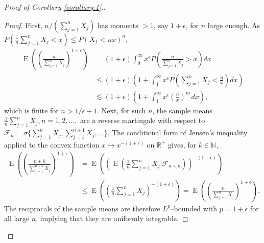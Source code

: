 \documentclass[12pt]{article}
\renewcommand{\P}{P}
\newcommand{\x}{X}
\DeclareMathOperator{\E}{E}
\begin{document}
\begin{proof}[Proof of Corollary \ref{corollary:1}.]
  \begin{proof}
    First, $n/(\sum_{j=1}^n\x_j)$ has moments $>1$, say $1+\epsilon$, for $n$ large enough. As $\P(\frac{1}{n}\sum_{j=1}^n\x_j<x)\le \P(\x_1<nx)^n$,
    \begin{align}
      \E\left(\left(\frac{n}{\sum_{j=1}^n\x_j}\right)^{1+\epsilon}\right) &=
                                                      (1+\epsilon)\int_0^\infty x^\epsilon\P\left(\frac{n}{\sum_{j=1}^n\x_j}>x\right)dx\\
                                                    &\le(1+\epsilon)\left(1+\int_1^\infty x^\epsilon\P\left(\sum_{j=1}^n\x_j<\frac{n}{x}\right)dx\right)\\
                                                    &\lesssim (1+\epsilon)\left(1+\int_1^\infty x^\epsilon\left(\frac{n}{x}\right)^{n\epsilon}dx\right),
    \end{align}
    which is finite for $n > 1/\epsilon+1$.
    Next, for such $n$,  the sample means $\frac{1}{n}\sum_{j=1}^n\x_j,n=1,2,\ldots,$ are a reverse martingale with respect to $\mathcal{F}_n=\sigma\{\sum_{j=1}^n\x_j,\sum_{j=1}^{n+1}\x_j,\ldots\}$. The conditional form of Jensen's inequality applied to the convex function $x\mapsto x^{-(1+\epsilon)}$ on $\mathbb{R}^+$ gives, for $k\in\mathbb{N}$,
    \begin{align}
      \E\left(\left(\frac{n+k}{\sum_{j=1}^{n+k}\x_j}\right)^{1+\epsilon}\right) &= \E\left(\left(\E\left(\frac{1}{n}\sum_{j=1}^n\x_j\bigg\vert\mathcal{F}_{n+k}\right)\right)^{-(1+\epsilon)}\right)\\
                                                                                &\le \E\left(\left(\frac{1}{n}\sum_{j=1}^n\x_j\right)^{-(1+\epsilon)}\right) =
                                                                                  \E\left(\left(\frac{n}{\sum_{j=1}^{n}\x_j}\right)^{1+\epsilon}\right).
    \end{align}
    The reciprocals of the sample means are therefore $L^p$--bounded with $p=1+\epsilon$ for all large $n$, implying that they are uniformly integrable.


\end{proof}
\end{proof}
\end{document}

